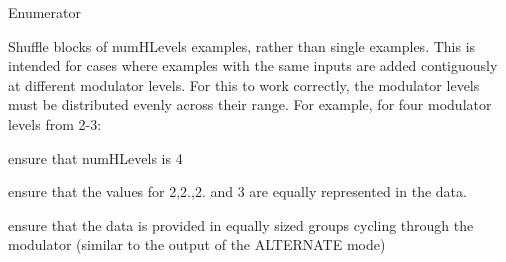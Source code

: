 \begin{Desc}
\item[Enumerator]\par
\begin{description}
\item[{\em 
S\+T\+R\+I\+DE\hypertarget{classExampleSet_afcdcdbc9a02c53864997e334d8bae33da7dfbbc7c9fb69bf8aacc556a1eaf4480}{}\label{classExampleSet_afcdcdbc9a02c53864997e334d8bae33da7dfbbc7c9fb69bf8aacc556a1eaf4480}
}]Shuffle blocks of num\+H\+Levels examples, rather than single examples. This is intended for cases where examples with the same inputs are added contiguously at different modulator levels. For this to work correctly, the modulator levels must be distributed evenly across their range. For example, for four modulator levels from 2-\/3\+: 
\begin{DoxyItemize}
\item ensure that num\+H\+Levels is 4
\item ensure that the values for 2,2.,2. and 3 are equally represented in the data.
\item ensure that the data is provided in equally sized groups cycling through the modulator (similar to the output of the A\+L\+T\+E\+R\+N\+A\+TE mode)
\end{DoxyItemize}


\end{description}
\end{Desc}
